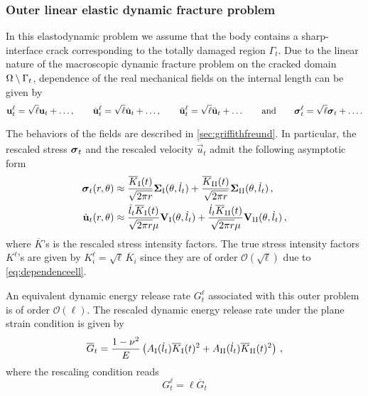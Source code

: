 \subsubsection{Outer linear elastic dynamic fracture problem}
In this elastodynamic problem we assume that the body contains a sharp-interface crack corresponding to the totally damaged region $\Gamma_t$. Due to the linear nature of the macroscopic dynamic fracture problem on the cracked domain ${\Omega\setminus\Gamma_t}$, dependence of the real mechanical fields on the internal length can be given by
\begin{equation} \label{eq:dependenceell}
\vec{u}_t^\ell=\sqrt{\ell}\vec{u}_t+\ldots,\qquad\dot{\vec{u}}^\ell_t=\sqrt{\ell}\dot{\vec{u}}_t+\ldots,\qquad\ddot{\vec{u}}^\ell_t=\sqrt{\ell}\ddot{\vec{u}}_t+\ldots\qquad\text{and}\qquad\sig_t^\ell=\sqrt{\ell}\sig_t+\ldots.
\end{equation}

The behaviors of the fields are described in \cref{sec:griffithfreund}. In particular, the rescaled stress $\sig_t$ and the rescaled velocity $\dot{\vec{u}}_t$ admit the following asymptotic form
\begin{equation} \label{eq:singularforms}
\begin{aligned}
\sig_t(r,\theta) &\approx \frac{\overline{K}_\RNN{1}(t)}{\sqrt{2\pi r}}\vec{\Sigma}_\RNN{1}(\theta,\dot{l}_t)+\frac{\overline{K}_\RNN{2}(t)}{\sqrt{2\pi r}}\vec{\Sigma}_\RNN{2}(\theta,\dot{l}_t)\,, \\
\dot{\vec{u}}_t(r,\theta) &\approx \frac{\dot{l}_t\overline{K}_\RNN{1}(t)}{\sqrt{2\pi r}\mu}\vec{V}_\RNN{1}(\theta,\dot{l}_t)+\frac{\dot{l}_t\overline{K}_\RNN{2}(t)}{\sqrt{2\pi r}\mu}\vec{V}_\RNN{2}(\theta,\dot{l}_t)\,,
\end{aligned}
\end{equation}
where $\overline{K}$'s is the rescaled stress intensity factors. The true stress intensity factors $K^\ell$'s are given by $K_i^\ell=\sqrt{\ell}\,\overline{K}_i$ since they are of order $\mathcal{O}(\sqrt{\ell})$ due to \eqref{eq:dependenceell}.

An equivalent dynamic energy release rate $G_t^\ell$ associated with this outer problem is of order $\mathcal{O}(\ell)$. The rescaled dynamic energy release rate under the plane strain condition is given by
\begin{equation} \label{eq:GasafunctionofKs}
\overline{G}_t=\frac{1-\nu^2}{E}\left(A_\RNN{1}(\dot{l}_t)\overline{K}_\RNN{1}(t)^2+A_\RNN{2}(\dot{l}_t)\overline{K}_\RNN{2}(t)^2\right)\,,
\end{equation}
where the rescaling condition reads
\begin{equation} \label{eq:Gtell}
G_t^\ell=\ell\overline{G}_t
\end{equation}

